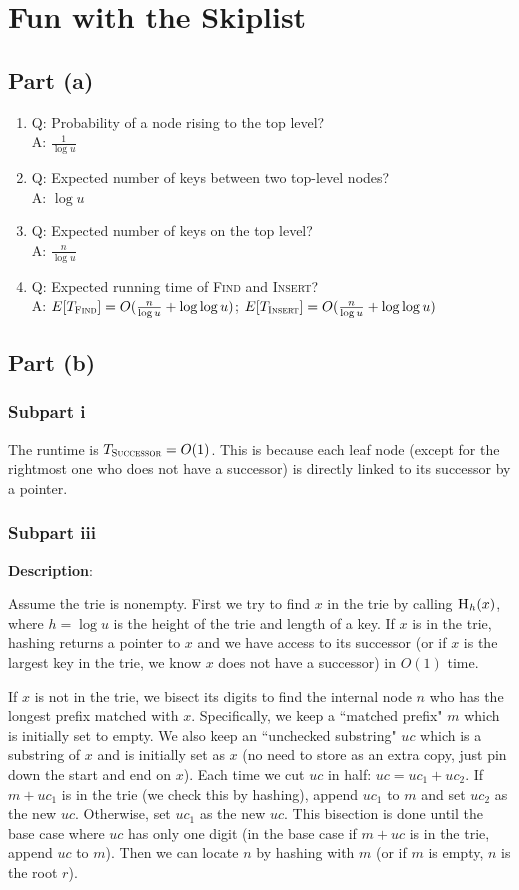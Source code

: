 \documentclass{article}
\begin{document}
\section{Fun with the Skiplist}
\subsection{Part (a)}
\begin{enumerate}
\item{Q: Probability of a node rising to the top level?\\A: $\frac{1}{\log u}$}
\item{Q: Expected number of keys between two top-level nodes?\\A: $\log u$}
\item{Q: Expected number of keys on the top level?\\A: $\frac{n}{\log u}$}
\item{Q: Expected running time of \textsc{Find} and \textsc{Insert}?\\A: $E[T_{\textsc{Find}}]=O(\frac{n}{\log u}+\log\log u)$; $E[T_{\textsc{Insert}}]=O(\frac{n}{\log u}+\log\log u)$}
\end{enumerate}

\subsection{Part (b)}
\subsubsection{Subpart i}
The runtime is $T_{\textsc{Successor}}=O(1)$. This is because each leaf node (except for the rightmost one who does not have a successor) is directly linked to its successor by a pointer.

\subsubsection{Subpart iii}
\noindent\textbf{Description}:

Assume the trie is nonempty. First we try to find $x$ in the trie by calling $\textsc{H}_h(x)$, where $h=\log u$ is the height of the trie and length of a key. If $x$ is in the trie, hashing returns a pointer to $x$ and we have access to its successor (or if $x$ is the largest key in the trie, we know $x$ does not have a successor) in $O(1)$ time.

If $x$ is not in the trie, we bisect its digits to find the internal node $n$ who has the longest prefix matched with $x$. Specifically, we keep a ``matched prefix" $m$ which is initially set to empty. We also keep an ``unchecked substring" $uc$ which is a substring of $x$ and is initially set as $x$ (no need to store as an extra copy, just pin down the start and end on $x$). Each time we cut $uc$ in half: $uc=uc_1+uc_2$. If $m+uc_1$ is in the trie (we check this by hashing), append $uc_1$ to $m$ and set $uc_2$ as the new $uc$. Otherwise, set $uc_1$ as the new $uc$. This bisection is done until the base case where $uc$ has only one digit (in the base case if $m+uc$ is in the trie, append $uc$ to $m$). Then we can locate $n$ by hashing with $m$ (or if $m$ is empty, $n$ is the root $r$).
\end{document}
